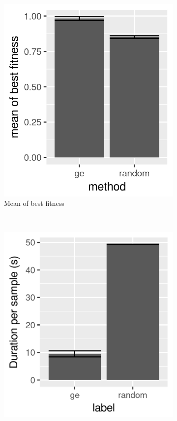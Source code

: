 \begin{figure}
    \centering
    \begin{subfigure}{0.4\textwidth}
        \includegraphics[width=\textwidth]{figures/ge-random}
        \caption{Mean of best fitness}
        \label{fig:ge-random}
    \end{subfigure}
    ~
    \begin{subfigure}{0.4\textwidth}
        \includegraphics[width=\textwidth]{figures/ge-random-duration}

\end{subfigure}
\end{figure}
